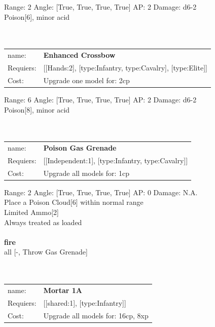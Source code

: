 {Range: 2  Angle: [True, True, True, True] AP: 2 Damage: d6-2 \\
Poison[6], minor acid\\ 








\ \\
\ \\
\begin{tabular}{ll}
name: & {\bf Enhanced Crossbow } \\
Requiers: & [[Hands:2], [type:Infantry, type:Cavalry], [type:Elite]] \\
Cost: & Upgrade one model for: 2cp \\
\end{tabular}



Range: 6  Angle: [True, True, True, True] AP: 2 Damage: d6-2 \\
Poison[8], minor acid\\ 








\ \\
\ \\
\begin{tabular}{ll}
name: & {\bf Poison Gas Grenade } \\
Requiers: & [[Independent:1], [type:Infantry, type:Cavalry]] \\
Cost: & Upgrade all models for: 1cp \\
\end{tabular}



Range: 2  Angle: [True, True, True, True] AP: 0 Damage: N.A. \\
Place a Poison Cloud[6] within normal range\\ 
Limited Ammo[2]\\ 
Always treated as loaded\\ 







\ \\ {\bf fire } \\
all [-, Throw Gas Grenade] \\

\ \\
\ \\
\begin{tabular}{ll}
name: & {\bf Mortar 1A } \\
Requiers: & [[shared:1], [type:Infantry]] \\
Cost: & Upgrade all models for: 16cp, 8xp \\
\end{tabular}



}
